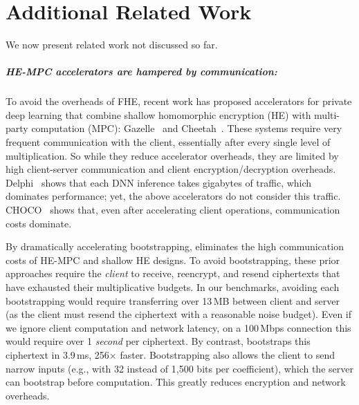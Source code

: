 \chapter{Additional Related Work}\label{sec:related}

We now present related work not discussed so far.

\paragraph{HE-MPC accelerators are hampered by communication:}
To avoid the overheads of FHE, recent work has proposed accelerators
for private deep learning
that combine shallow homomorphic encryption (HE) with multi-party computation (MPC):
Gazelle~\cite{juvekar2018gazelle} and Cheetah~\cite{reagen:hpca21:cheetah}.
These systems require very frequent communication with the client,
essentially after every single level of multiplication.
So while they reduce accelerator overheads, they are limited by high client-server communication
and client encryption/decryption overheads.
Delphi~\cite{mishra2020delphi} shows that each DNN inference takes gigabytes of traffic,
which dominates performance; yet, the above accelerators do not consider this traffic.
CHOCO~\cite{vanderhagen:arxiv21:choco} shows that, even after accelerating client operations,
communication costs dominate.

By dramatically accelerating bootstrapping, \name eliminates the high communication costs of HE-MPC and shallow HE designs.
To avoid bootstrapping, these prior approaches require the \emph{client} to receive, reencrypt, and resend ciphertexts that have exhausted their multiplicative budgets.
In our benchmarks, avoiding each bootstrapping would require transferring over 13\,MB between client and server
(as the client must resend the ciphertext with a reasonable noise budget).
Even if we ignore client computation and network latency, on a 100\,Mbps connection this would
require over 1 \emph{second} per ciphertext.
By contrast, \name bootstraps this ciphertext in 3.9\,ms, 256$\times$ faster.
Bootstrapping also allows the client to send narrow inputs (e.g., with 32 instead of 1,500 bits per coefficient),
which the server can bootstrap before computation.
This greatly reduces encryption and network overheads.

